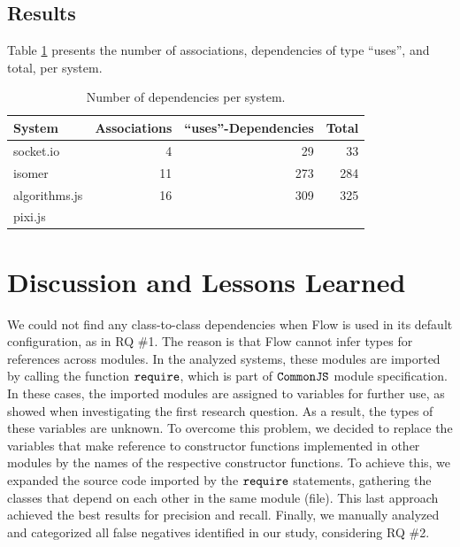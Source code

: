 \documentclass[review]{elsarticle}
\newcommand{\aspas}[1]{{``#1''}}
\newcommand{\mcode}[1]{$\tt #1$}
\begin{document}
\subsection{Results}
\label{sec:results-vanilla}

Table \ref{tab:results-vanilla} presents the number of associations, dependencies of type \aspas{uses}, and total, per system.
 
\begin{table}%
	\footnotesize
	\centering
	\caption{Number of dependencies per system.}
	\begin{tabular}{lrrr}
		\toprule
		System              & Associations & \aspas{uses}-Dependencies & Total    \\
		\midrule
		{\sc socket.io}     &            4 &                        29 &    33    \\  
		{\sc isomer}        &           11 &                       273 &   284    \\  
		{\sc algorithms.js} &           16 &                       309 &   325  \\  
		{\sc pixi.js}       &              &                           &        \\ 
		\bottomrule
	\end{tabular}
	\label{tab:results-vanilla}
\end{table}



\section {Discussion and Lessons Learned}
\label{sec:discussion}

We could not find any class-to-class dependencies when Flow is used in its default configuration, as in RQ \#1. The reason is that Flow cannot infer types for references across modules. In the analyzed systems, these modules are imported by calling the function \mcode{require}, which is part of \mcode{CommonJS} module specification. In these cases, the imported modules are assigned to variables for further use, as showed when investigating the first research question. As a result, the types of these variables are unknown. To overcome this problem, we decided to replace the variables that make reference to constructor functions implemented in other modules by the names of the respective constructor functions. To achieve this, we expanded the source code imported by the \mcode{require} statements, gathering the classes that depend on each other in the same module (file). This last approach achieved the best results for precision and recall. Finally, we manually analyzed and categorized all false negatives identified in our study, considering RQ \#2. 
\end{document}
